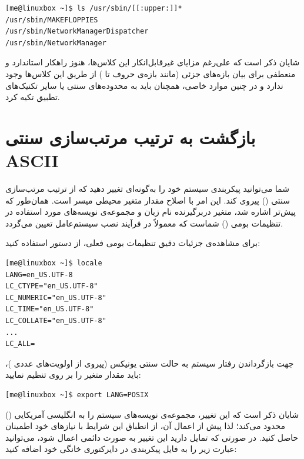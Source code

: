 \begin{latin}
\begin{lstlisting}
[me@linuxbox ~]$ ls /usr/sbin/[[:upper:]]*
/usr/sbin/MAKEFLOPPIES
/usr/sbin/NetworkManagerDispatcher
/usr/sbin/NetworkManager
\end{lstlisting}
\end{latin}

شایان ذکر است که علی‌رغم مزایای غیرقابل‌انکار این کلاس‌ها، هنوز راهکار استاندارد و منعطفی برای بیان بازه‌های جزئی (مانند بازه‌ی حروف  تا ) از طریق این کلاس‌ها وجود ندارد و در چنین موارد خاصی، همچنان باید به محدوده‌های سنتی یا سایر تکنیک‌های تطبیق تکیه کرد.

\section{بازگشت به ترتیب مرتب‌سازی سنتی ASCII}

شما می‌توانید پیکربندی سیستم خود را به‌گونه‌ای تغییر دهید که از ترتیب مرتب‌سازی سنتی () پیروی کند. این امر با اصلاح مقدار متغیر محیطی  میسر است. همان‌طور که پیش‌تر اشاره شد، متغیر  دربرگیرنده نام زبان و مجموعه‌ی نویسه‌های مورد استفاده در تنظیمات بومی () شماست که معمولاً در فرآیند نصب سیستم‌عامل تعیین می‌گردد.

برای مشاهده‌ی جزئیات دقیق تنظیمات بومی فعلی، از دستور  استفاده کنید:

\begin{latin}
\begin{lstlisting}
[me@linuxbox ~]$ locale
LANG=en_US.UTF-8
LC_CTYPE="en_US.UTF-8"
LC_NUMERIC="en_US.UTF-8"
LC_TIME="en_US.UTF-8"
LC_COLLATE="en_US.UTF-8"
...
LC_ALL=
\end{lstlisting}
\end{latin}

جهت بازگرداندن رفتار سیستم به حالت سنتی یونیکس (پیروی از اولویت‌های عددی )، باید مقدار متغیر  را بر روی  تنظیم نمایید:

\begin{latin}
\begin{lstlisting}
[me@linuxbox ~]$ export LANG=POSIX
\end{lstlisting}
\end{latin}

شایان ذکر است که این تغییر، مجموعه‌ی نویسه‌های سیستم را به انگلیسی آمریکایی () محدود می‌کند؛ لذا پیش از اعمال آن، از انطباق این شرایط با نیازهای خود اطمینان حاصل کنید. در صورتی که تمایل دارید این تغییر به صورت دائمی اعمال شود، می‌توانید عبارت زیر را به فایل پیکربندی  در دایرکتوری خانگی خود اضافه کنید:

